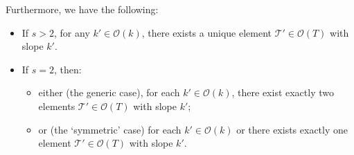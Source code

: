\documentclass[11pt,a4paper]{amsart}
\numberwithin{equation}{section}
\begin{document}
\begin{theorem}
Furthermore, we have the following: 
\begin{itemize}
\item If $s>2$, for any $k'\in \mathcal O(k)$, there exists a unique element $\mathcal T'\in \mathcal O(T)$ with slope $k'$.
\item If $s=2$, then:
\begin{itemize}
\item either (the generic case), for each $k'\in \mathcal O(k)$,  there exist exactly two elements $\mathcal T'\in \mathcal O(T)$ with slope $k'$;
\item or (the `symmetric' case) for each $k'\in \mathcal O(k)$
or there exists exactly one element $\mathcal T'\in \mathcal O(T)$ with slope $k'$.
\end{itemize}
\end{itemize}
\end{theorem}
\end{document}
